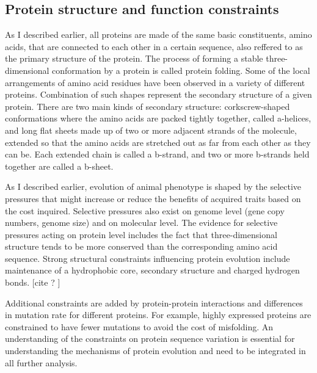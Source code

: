 \documentclass[11pt, a4paper,oneside]{report}
\begin{document}
\subsection{Protein structure and function constraints}
As I described earlier,  all proteins are made of the
same basic constituents, amino acids, that are connected to each other in a certain sequence, also reffered to as the primary structure of the protein. The process of forming a stable three-dimensional conformation by a protein is called protein folding. 
 Some of the local arrangements of amino acid residues have been observed in a variety of different proteins.  Combination of such  shapes represent the secondary structure of a given protein.  There are two main kinds of secondary structure: corkscrew-shaped conformations where the amino acids are packed tightly together, called a-helices, and long flat sheets made up of two or more adjacent strands of the molecule, extended so that the amino acids are stretched out as far from each other as they can be. Each extended chain is called a b-strand, and two or more b-strands held together  are called a b-sheet.


As I described earlier, evolution of animal phenotype is shaped by the selective pressures that might increase or reduce the benefits of acquired traits based on the cost inquired. Selective pressures also exist on genome level (gene copy numbers, genome size) and on molecular level. The evidence for selective pressures acting on protein level includes the fact that three-dimensional structure tends to be more conserved than the corresponding amino acid sequence\cite{Illergard2009}.  Strong structural constraints influencing protein evolution include maintenance of a hydrophobic core, secondary structure and charged hydrogen bonds. [cite ? ] 

Additional constraints are added by protein-protein interactions\cite{Park2001} and differences in mutation rate for different proteins. For example, highly expressed proteins are constrained to have fewer mutations to avoid the cost of misfolding\cite{Subramanian2004}.  An understanding of the constraints on protein sequence variation is essential for understanding the mechanisms of protein evolution and need to be integrated in all further analysis. 
\end{document}
